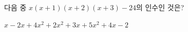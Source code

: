 다음 중 $x(x+1)(x+2)(x+3)-24$의 인수인 것은?
\begin{choices32}{$x-2$}{$x+4$}{$x^2+2$}{$x^2+3x+5$}{$x^2+4x-2$}\end{choices32}
